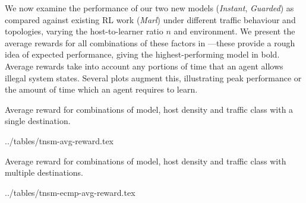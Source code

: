 \documentclass[10pt, times, comsoc]{IEEEtran}
\begin{document}
We now examine the performance of our two new models (\emph{Instant}, \emph{Guarded}) as compared against existing RL work (\emph{Marl}) under different traffic behaviour and topologies, varying the host-to-learner ratio $n$ and environment.
We present the average rewards for all combinations of these factors in ---these provide a rough idea of expected performance, giving the highest-performing model in bold.
Average rewards take into account any portions of time that an agent allows illegal system states.
Several plots augment this, illustrating peak performance or the amount of time which an agent requires to learn.

\begin{table}
	\centering
	\caption{Average reward for combinations of model, host density and traffic class with a single destination.\label{tab:av-vals}}
	
	\expandableinput ../tables/tnsm-avg-reward.tex
\end{table}
\begin{table}
	\centering
	\caption{Average reward for combinations of model, host density and traffic class with multiple destinations.\label{tab:av-ecmp-vals}}
	
	\expandableinput ../tables/tnsm-ecmp-avg-reward.tex
\end{table}
\end{document}
